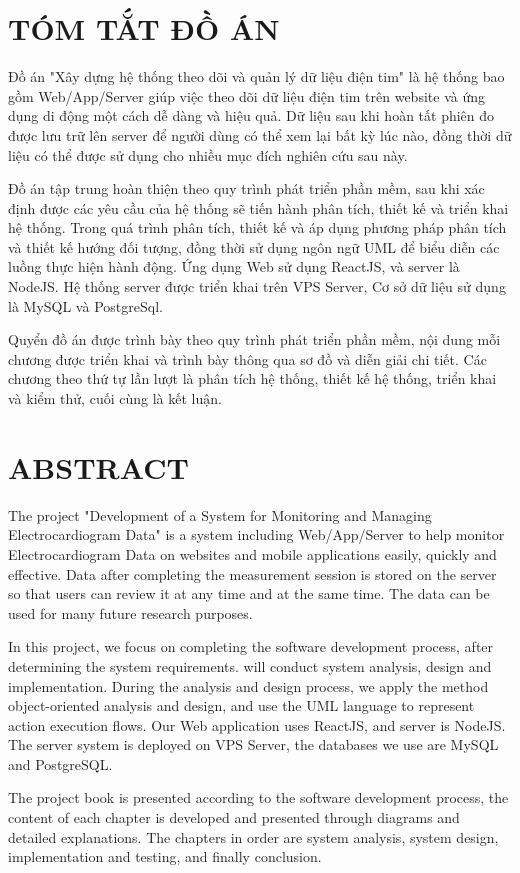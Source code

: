 \section*{TÓM TẮT ĐỒ ÁN}

Đồ án "Xây dựng hệ thống theo dõi và quản lý dữ liệu điện tim" là hệ thống bao gồm Web/App/Server giúp việc theo dõi dữ liệu điện tim trên website và ứng dụng di động một cách dễ dàng và
hiệu quả. Dữ liệu sau khi hoàn tất phiên đo được lưu trữ lên server để người dùng có thể xem lại bất kỳ lúc nào, đồng thời
dữ liệu có thể được sử dụng cho nhiều mục đích nghiên cứu sau này.

Đồ án tập trung hoàn thiện theo quy trình phát triển phần mềm, sau khi xác định được các yêu cầu của hệ thống
sẽ tiến hành phân tích, thiết kế và triển khai hệ thống. Trong quá trình phân tích, thiết kế và áp dụng phương pháp
phân tích và thiết kế hướng đối tượng, đồng thời sử dụng ngôn ngữ UML để biểu diễn các luồng thực hiện hành động. Ứng dụng Web sử dụng ReactJS, và server
là NodeJS. Hệ thống server được triển khai trên VPS Server, Cơ sở dữ liệu sử dụng là MySQL và PostgreSql.

Quyển đồ án được trình bày theo quy trình phát triển phần mềm, nội dung mỗi chương được triển khai và trình bày thông qua sơ đồ và diễn giải chi tiết. 
Các chương theo thứ tự lần lượt là phân tích hệ thống, thiết kế hệ thống, triển khai và kiểm thử, cuối cùng là kết luận.


\newpage
\section*{ABSTRACT}

The project "Development of a System for Monitoring and Managing Electrocardiogram Data" is a system including Web/App/Server to help monitor Electrocardiogram Data on websites and mobile applications easily, quickly and effective. Data after completing the measurement session is stored on the server so that users can review it at any time and at the same time. The data can be used for many future research purposes.

In this project, we focus on completing the software development process, after determining the system requirements.
will conduct system analysis, design and implementation. During the analysis and design process, we apply the method
object-oriented analysis and design, and use the UML language to represent action execution flows. Our Web application uses ReactJS, and server
is NodeJS. The server system is deployed on VPS Server, the databases we use are MySQL and PostgreSQL.

The project book is presented according to the software development process, the content of each chapter is developed and presented through diagrams and detailed explanations.
The chapters in order are system analysis, system design, implementation and testing, and finally conclusion.

\cleardoublepage



